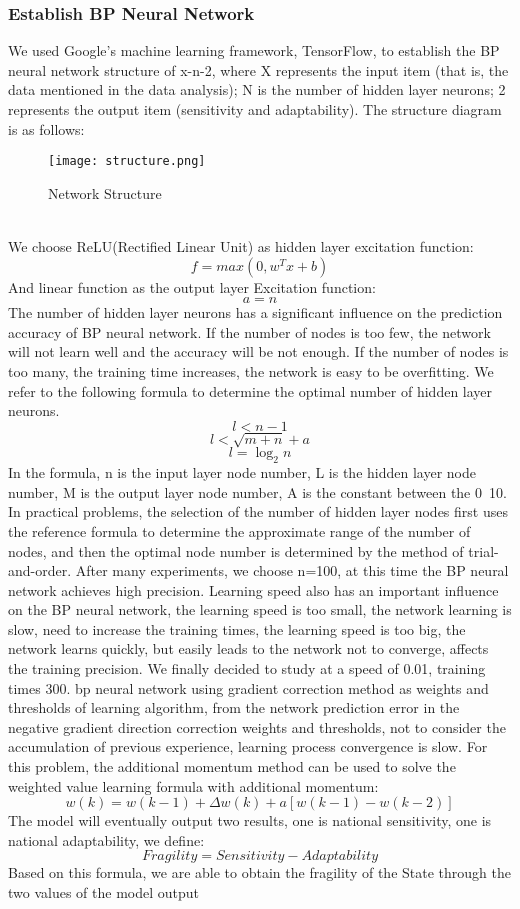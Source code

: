 \documentclass{mcmthesis}
\begin{document}
\subsubsection{Establish BP Neural Network}
We used Google's machine learning framework, TensorFlow, to establish the BP 
neural network structure of x-n-2, where X represents the input item (that is, 
the data mentioned in the data analysis); N is the number of hidden layer neurons; 2 
represents the output item (sensitivity and adaptability). The structure diagram is 
as follows:
\begin{figure}[h]
\small
\centering
\texttt{[image: structure.png]}
\caption{Network Structure} 
\label{fig:ns}
\end{figure}\\
\newpage
We choose ReLU(Rectified Linear Unit) as hidden layer excitation function:
\[ f=max\left ( 0,w^{T}x+b \right ) \]
And linear function as the output layer Excitation function:
\[ a=n \]
The number of hidden layer neurons has a significant influence on 
the prediction accuracy of BP neural network. If the number of 
nodes is too few, the network will not learn well and the accuracy 
will be not enough. If the number of nodes is too many, the 
training time increases, the network is easy to be overfitting. 
We refer to the following formula to determine the optimal number 
of hidden layer neurons.
\[ l< n-1 \]
\[ l<\sqrt{m+n}+a \]
\[ l=\log_{2} n \]
In the formula, n is the input layer node number, L is the hidden 
layer node number, M is the output layer node number, A is the constant 
between the 0~10. In practical problems, the selection of the number 
of hidden layer nodes first uses the reference formula to determine 
the approximate range of the number of nodes, and then the optimal 
node number is determined by the method of trial-and-order. After 
many experiments, we choose n=100, at this time the BP neural network 
achieves high precision. Learning speed also has an important influence 
on the BP neural network, the learning speed is too small, the 
network learning is slow, need to increase the training times, the 
learning speed is too big, the network learns quickly, but easily 
leads to the network not to converge, affects the training precision. 
We finally decided to study at a speed of 0.01, training times 300. 
bp neural network using gradient correction method as weights and 
thresholds of learning algorithm, from the network prediction error 
in the negative gradient direction correction weights and thresholds, 
not to consider the accumulation of previous experience, learning 
process convergence is slow. For this problem, the additional momentum 
method can be used to solve the weighted value learning formula 
with additional momentum:
\[ w\left ( k \right )=
w\left ( k-1 \right )+\Delta w\left 
( k \right )+a\left [ w\left ( k-1 \right )-w\left 
( k-2 \right ) \right ] \]
The model will eventually output two results, one is national 
sensitivity, one is national adaptability, we define:
\[ Fragility = Sensitivity - Adaptability \]
Based on this formula, we are able to obtain the 
fragility of the State through the two values of the model output
\end{document}
